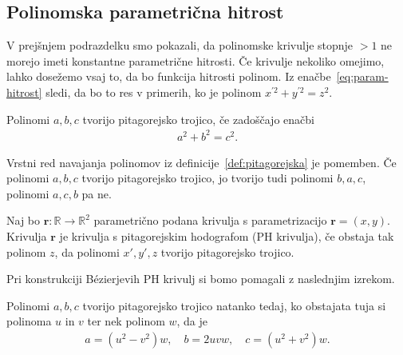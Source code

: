 \documentclass[isrm2, tisk]{fmfdelo}
\newcommand{\R}{\mathbb R}
\begin{document}
    \subsection{Polinomska parametrična hitrost}
    V prejšnjem podrazdelku smo pokazali, da polinomske krivulje stopnje $>1$ ne morejo imeti konstantne parametrične hitrosti.
    Če krivulje nekoliko omejimo, lahko dosežemo vsaj to, da bo funkcija hitrosti polinom.
    Iz enačbe~\eqref{eq:param-hitrost} sledi, da bo to res v primerih, ko je polinom $x^{'2}+y^{'2}=z^2$.
    \begin{definicija}
        \label{def:pitagorejska}
        Polinomi $a,b,c$ tvorijo pitagorejsko trojico, če zadoščajo enačbi
        \begin{align*}
            a^2+b^2=c^2.
        \end{align*}
    \end{definicija}
    \begin{opomba}
        Vrstni red navajanja polinomov iz definicije~\ref{def:pitagorejska} je pomemben.
        Če polinomi $a,b,c$ tvorijo pitagorejsko trojico, jo tvorijo tudi polinomi $b,a,c$, polinomi $a,c,b$ pa ne.
    \end{opomba}
    \begin{definicija}
        Naj bo $\mathbf{r}:\R\to\R^2$ parametrično podana krivulja s parametrizacijo $\mathbf{r}=(x,y)$.
        Krivulja $\mathbf{r}$ je krivulja s pitagorejskim hodografom (PH krivulja), če obstaja tak polinom $z$, da polinomi $x',y',z$ tvorijo pitagorejsko trojico.
    \end{definicija}
    \noindent Pri konstrukciji Bézierjevih PH krivulj si bomo pomagali z naslednjim izrekom.
    \begin{izrek}
        \label{izrek:pitagorejske}         %
        Polinomi $a,b,c$ tvorijo pitagorejsko trojico natanko tedaj, ko obstajata tuja si polinoma $u$ in $v$ ter nek polinom  $w$, da je
        \begin{align*}
            a=(u^2-v^2)w,\quad b=2uvw,\quad c=(u^2+v^2)w.
        \end{align*}
    \end{izrek}
\end{document}
